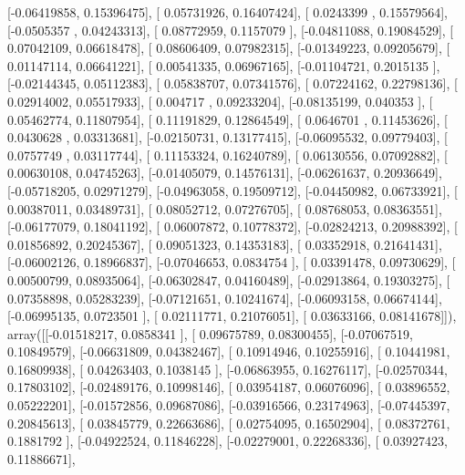 \documentclass{article}
\begin{document}
       [-0.06419858,  0.15396475],
       [ 0.05731926,  0.16407424],
       [ 0.0243399 ,  0.15579564],
       [-0.0505357 ,  0.04243313],
       [ 0.08772959,  0.1157079 ],
       [-0.04811088,  0.19084529],
       [ 0.07042109,  0.06618478],
       [ 0.08606409,  0.07982315],
       [-0.01349223,  0.09205679],
       [ 0.01147114,  0.06641221],
       [ 0.00541335,  0.06967165],
       [-0.01104721,  0.2015135 ],
       [-0.02144345,  0.05112383],
       [ 0.05838707,  0.07341576],
       [ 0.07224162,  0.22798136],
       [ 0.02914002,  0.05517933],
       [ 0.004717  ,  0.09233204],
       [-0.08135199,  0.040353  ],
       [ 0.05462774,  0.11807954],
       [ 0.11191829,  0.12864549],
       [ 0.0646701 ,  0.11453626],
       [ 0.0430628 ,  0.03313681],
       [-0.02150731,  0.13177415],
       [-0.06095532,  0.09779403],
       [ 0.0757749 ,  0.03117744],
       [ 0.11153324,  0.16240789],
       [ 0.06130556,  0.07092882],
       [ 0.00630108,  0.04745263],
       [-0.01405079,  0.14576131],
       [-0.06261637,  0.20936649],
       [-0.05718205,  0.02971279],
       [-0.04963058,  0.19509712],
       [-0.04450982,  0.06733921],
       [ 0.00387011,  0.03489731],
       [ 0.08052712,  0.07276705],
       [ 0.08768053,  0.08363551],
       [-0.06177079,  0.18041192],
       [ 0.06007872,  0.10778372],
       [-0.02824213,  0.20988392],
       [ 0.01856892,  0.20245367],
       [ 0.09051323,  0.14353183],
       [ 0.03352918,  0.21641431],
       [-0.06002126,  0.18966837],
       [-0.07046653,  0.0834754 ],
       [ 0.03391478,  0.09730629],
       [ 0.00500799,  0.08935064],
       [-0.06302847,  0.04160489],
       [-0.02913864,  0.19303275],
       [ 0.07358898,  0.05283239],
       [-0.07121651,  0.10241674],
       [-0.06093158,  0.06674144],
       [-0.06995135,  0.0723501 ],
       [ 0.02111771,  0.21076051],
       [ 0.03633166,  0.08141678]]), array([[-0.01518217,  0.0858341 ],
       [ 0.09675789,  0.08300455],
       [-0.07067519,  0.10849579],
       [-0.06631809,  0.04382467],
       [ 0.10914946,  0.10255916],
       [ 0.10441981,  0.16809938],
       [ 0.04263403,  0.1038145 ],
       [-0.06863955,  0.16276117],
       [-0.02570344,  0.17803102],
       [-0.02489176,  0.10998146],
       [ 0.03954187,  0.06076096],
       [ 0.03896552,  0.05222201],
       [-0.01572856,  0.09687086],
       [-0.03916566,  0.23174963],
       [-0.07445397,  0.20845613],
       [ 0.03845779,  0.22663686],
       [ 0.02754095,  0.16502904],
       [ 0.08372761,  0.1881792 ],
       [-0.04922524,  0.11846228],
       [-0.02279001,  0.22268336],
       [ 0.03927423,  0.11886671],
\end{document}
